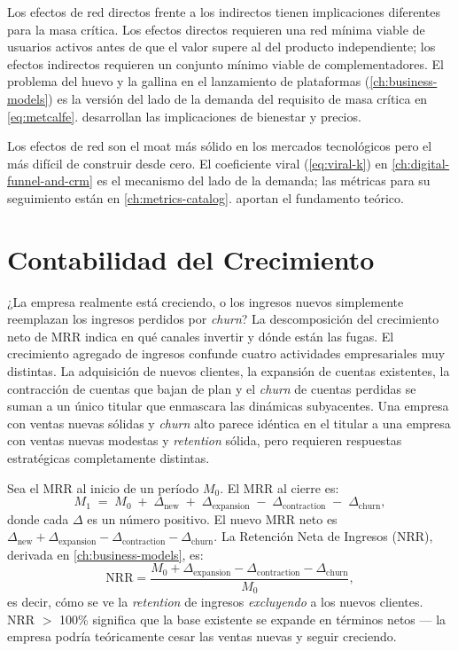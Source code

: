 Los efectos de red directos frente a los indirectos tienen implicaciones diferentes para
la masa crítica. Los efectos directos requieren una red mínima viable de usuarios activos
antes de que el valor supere al del producto independiente; los efectos indirectos requieren
un conjunto mínimo viable de complementadores. El problema del huevo y la gallina en el
lanzamiento de plataformas (\cref{ch:business-models}) es la versión del lado de la demanda
del requisito de masa crítica en \cref{eq:metcalfe}.
\parencite{dranove7theconomics} desarrollan las implicaciones de bienestar y precios.

Los efectos de red son el moat más sólido en los mercados tecnológicos pero el más difícil
de construir desde cero. El coeficiente viral (\cref{eq:viral-k}) en
\cref{ch:digital-funnel-and-crm} es el mecanismo del lado de la demanda; las métricas para
su seguimiento están en \cref{ch:metrics-catalog}. \textcite{dranove7theconomics} aportan
el fundamento teórico.

\section{Contabilidad del Crecimiento}\label{sec:growth-accounting}

¿La empresa realmente está creciendo, o los ingresos nuevos simplemente reemplazan los
ingresos perdidos por \emph{churn}? La descomposición del crecimiento neto de MRR indica en
qué canales invertir y dónde están las fugas. El crecimiento agregado de ingresos confunde
cuatro actividades empresariales muy distintas. La adquisición de nuevos clientes, la
expansión de cuentas existentes, la contracción de cuentas que bajan de plan y el
\emph{churn} de cuentas perdidas se suman a un único titular que enmascara las dinámicas
subyacentes. Una empresa con ventas nuevas sólidas y \emph{churn} alto parece idéntica en
el titular a una empresa con ventas nuevas modestas y \emph{retention} sólida, pero
requieren respuestas estratégicas completamente distintas.

Sea el MRR al inicio de un período \(M_0\). El MRR al cierre es:
\begin{equation}\label{eq:mrr-growth}
  M_1 \;=\; M_0 \;+\; \Delta_{\text{new}}
               \;+\; \Delta_{\text{expansion}}
               \;-\; \Delta_{\text{contraction}}
               \;-\; \Delta_{\text{churn}},
\end{equation}
donde cada \(\Delta\) es un número positivo. El nuevo MRR neto es
\(\Delta_{\text{new}} + \Delta_{\text{expansion}} - \Delta_{\text{contraction}} - \Delta_{\text{churn}}\).
La Retención Neta de Ingresos (NRR), derivada en \cref{ch:business-models}, es:
\[
  \mathrm{NRR} = \frac{M_0 + \Delta_{\text{expansion}} - \Delta_{\text{contraction}} - \Delta_{\text{churn}}}{M_0},
\]
es decir, cómo se ve la \emph{retention} de ingresos \emph{excluyendo} a los nuevos
clientes. NRR $>$ 100\% significa que la base existente se expande en términos netos ---
la empresa podría teóricamente cesar las ventas nuevas y seguir creciendo.

